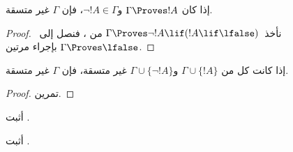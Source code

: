 \documentclass[../../../include/open-logic-section]{subfiles}
\begin{document}
\begin{prop}
  إذا كان $\Gamma \Proves !A$ و$\lnot !A \in \Gamma$، فإن $\Gamma$
  غير متسقة.
\end{prop}

\begin{proof}
  نأخذ~$\Gamma \Proves \lnot !A \lif (!A \lif \lfalse)$ من
  ، فنصل إلى~$\Gamma \Proves \lfalse$
  بإجراء  مرتين.
\end{proof}


\begin{prop}
  إذا كانت كل من $\Gamma \cup \{!A\}$ و$\Gamma \cup \{\lnot !A\}$
  غير متسقة، فإن $\Gamma$ غير متسقة.
\end{prop}

\begin{proof}
تمرين.
\end{proof}

\begin{prob}
  أثبت .
\end{prob}
\tagendprob

\begin{prob}
  أثبت .
\end{prob}
\tagendprob
\end{document}
